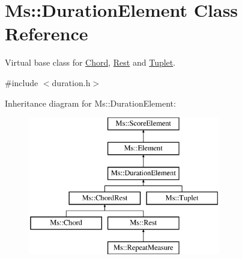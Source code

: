 \hypertarget{class_ms_1_1_duration_element}{}\section{Ms\+:\+:Duration\+Element Class Reference}
\label{class_ms_1_1_duration_element}


Virtual base class for \hyperlink{class_ms_1_1_chord}{Chord}, \hyperlink{class_ms_1_1_rest}{Rest} and \hyperlink{class_ms_1_1_tuplet}{Tuplet}.  




{\ttfamily \#include $<$duration.\+h$>$}

Inheritance diagram for Ms\+:\+:Duration\+Element\+:\begin{figure}[H]
\begin{center}
\leavevmode
\includegraphics[height=6.000000cm]{class_ms_1_1_duration_element}
\end{center}
\end{figure}
